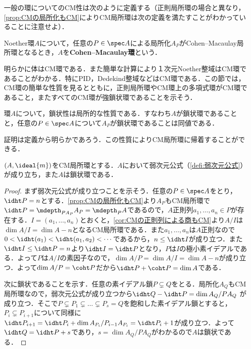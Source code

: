 一般の環についてのCM性は次のように定義する（正則局所環の場合と異なり，\ref{prop:CMの局所化もCM}によりCM局所環は次の定義を満たすことがわかっていることに注意せよ）．
\begin{defi}
	Noether環$A$について，任意の$P\in\spec A$による局所化$A_P$がCohen--Macaulay局所環となるとき，$A$を\textbf{Cohen--Macaulay環}という．
\end{defi}

明らかに体はCM環である．また簡単な計算により１次元Noether整域はCM環であることがわかる．特にPID，Dedekind整域などはCM環である．この節では，CM環の簡単な性質を見るとともに，正則局所環やCM環上の多項式環がCM環であること，またすべてのCM環が強鎖状環であることを示そう．

\begin{prop}
	環$A$について，鎖状性は局所的な性質である．すなわち$A$が鎖状環であることと，任意の$P\in\spec A$について$A_P$が鎖状環であることは同値である．
\end{prop}

証明は定義から明らかであろう．この性質によりCM局所環に帰着することができる．

\begin{thm}
	$(A,\ideal{m})$をCM局所環とする．$A$において弱次元公式（\ref{defi:弱次元公式}）が成り立ち，また$A$は鎖状環である．
\end{thm}

\begin{proof}
	まず弱次元公式が成り立つことを示そう．任意の$P\in\spec A$をとり，$\idht P=n$とする．\ref{prop:CMの局所化もCM}より$A_P$もCM局所環で$\idht P=\mdepth_{PA_P} A_P=\mdepth_P A$であるので，$A$正則列$a_1,\dots,a_n\in P$が存在する．$I=(a_1,\dots,a_n)$とおくと，\ref{cor:CMの正則列による商もCM}より$A/I$は$\dim A/I=\dim A-n$となるCM局所環である．また$a_1,\dots,a_n$は$A$正則なので$0<\idht(a_1)<\idht(a_1,a_2)<\cdots$であるから，$n\leq\idht I$が成り立つ．また$\idht I\leq\idht P=n$より$\idht I=\idht P$となり，$P$は$I$の極小素イデアルである．よって$P$は$A/I$の素因子なので，$\dim A/P=\dim A/I=\dim A-n$が成り立つ．よって$\dim A/P=\coht P$だから$\idht P+\coht P=\dim A$である．
	
	次に鎖状であることを示す．任意の素イデアル鎖$P\subsetneq Q$をとる．局所化$A_Q$もCM局所環なので，弱次元公式が成り立つから$\idht Q-\idht P=\dim A_Q/PA_Q$
	が成り立つ．そこで$P\subsetneq P_1\subsetneq \dots\subsetneq P_s=Q$を飽和した素イデアル鎖とすると，$P_i\subsetneq P_{i+1}$について同様に$\idht P_{i+1}=\idht P_i+\dim A_{P_i}/P_{i-1}A_{P_i}=\idht P_i+1$が成り立つ．よって$\idht Q=\idht P+s$であり，$s=\dim A_Q/PA_Q$がわかるので$A$は鎖状である．
\end{proof}

